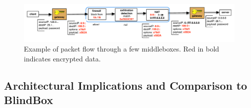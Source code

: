 \begin{figure}[t!]
\begin{center}
  \includegraphics[width=6.7in]{fig/packetpath.pdf}
\caption{Example of packet flow through a few middleboxes. Red in bold indicates encrypted data. \label{fig:packetflow} }
\end{center}
\end{figure}


%
%
%




\subsection{Architectural Implications and Comparison to BlindBox} \label{s:archbb} \label{sec:bbarch}



